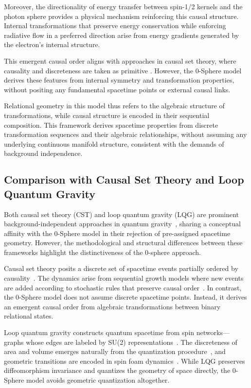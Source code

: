 \documentclass[%
 reprint,
 amsmath,amssymb,
 aps,
]{revtex4-1}
\numberwithin{equation}{section}%
\begin{document}
Moreover, the directionality of energy transfer between spin-1/2 kernels and the photon sphere \cite{hanamura2506.0072} provides a physical mechanism reinforcing this causal structure. Internal transformations that preserve energy conservation while enforcing radiative flow in a preferred direction arise from energy gradients generated by the electron's internal structure.

This emergent causal order aligns with approaches in causal set theory, where causality and discreteness are taken as primitive \cite{bombelli1987, surya2019}. However, the 0-Sphere model derives these features from internal symmetry and transformation properties, without positing any fundamental spacetime points or external causal links.

Relational geometry in this model thus refers to the algebraic structure of transformations, while causal structure is encoded in their sequential composition. This framework derives spacetime properties from discrete transformation sequences and their algebraic relationships, without assuming any underlying continuous manifold structure, consistent with the demands of background independence.


\subsection{Comparison with Causal Set Theory and Loop Quantum Gravity}
\label{subsec:cst_lqg_comparison}

Both causal set theory (CST) and loop quantum gravity (LQG) are prominent background-independent approaches in quantum gravity~\cite{oriti2009}, sharing a conceptual affinity with the 0-Sphere model in their rejection of pre-assigned spacetime geometry. However, the methodological and structural differences between these frameworks highlight the distinctiveness of the 0-sphere approach.

Causal set theory posits a discrete set of spacetime events partially ordered by causality~\cite{sorkin2003, dowker2005}. The dynamics arise from sequential growth models where new events are added according to stochastic rules that preserve causal order~\cite{rideout2000}. In contrast, the 0-Sphere model does not assume discrete spacetime points. Instead, it derives an emergent causal order from algebraic transformations between binary relational states.

Loop quantum gravity constructs quantum spacetime from spin networks—graphs whose edges are labeled by SU(2) representations~\cite{rovelli2004, baez1994}. The discreteness of area and volume emerges naturally from the quantization procedure~\cite{rovelli1995}, and geometric transitions are encoded in spin foam dynamics~\cite{freidel2005}. While LQG preserves diffeomorphism invariance and quantizes the geometry of space directly, the 0-Sphere model avoids geometric quantization altogether.
\end{document}
